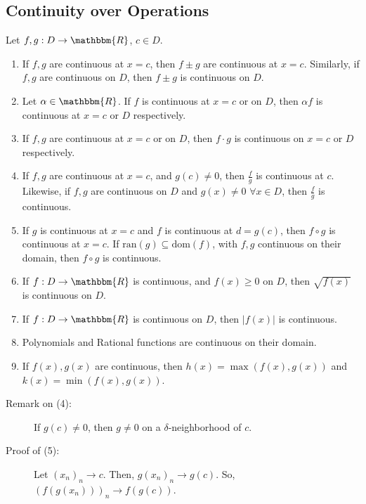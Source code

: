\documentclass[10pt]{extarticle}
\newcommand{\R}{\mathbbm{R}}
\begin{document}
  \subsection{Continuity over Operations}%
    Let $f,g: D\rightarrow \R$, $c\in D$.
    \begin{enumerate}[(1)]
      \item If $f,g$ are continuous at $x = c$, then $f\pm g$ are continuous at $x=c$. Similarly, if $f,g$ are continuous on $D$, then $f\pm g$ is continuous on $D$.
      \item Let $\alpha \in \R$. If $f$ is continuous at $x=c$ or on $D$, then $\alpha f$ is continuous at $x=c$ or $D$ respectively.
      \item If $f,g$ are continuous at $x=c$ or on $D$, then $f\cdot g$ is continuous on $x=c$ or $D$ respectively.
      \item If $f,g$ are continuous at $x=c$, and $g(c) \neq 0$, then $\frac{f}{g}$ is continuous at $c$. Likewise, if $f,g$ are continuous on $D$ and $g(x)\neq 0$ $\forall x\in D$, then $\frac{f}{g}$ is continuous.
      \item If $g$ is continuous at $x=c$ and $f$ is continuous at $d=g(c)$, then $f\circ g$ is continuous at $x=c$. If $\text{ran}(g) \subseteq \text{dom}(f)$, with $f,g$ continuous on their domain, then $f\circ g$ is continuous.
      \item If $f: D\rightarrow \R$ is continuous, and $f(x) \geq 0$ on $D$, then $\sqrt{f(x)}$ is continuous on $D$.
      \item If $f: D\rightarrow \R$ is continuous on $D$, then $|f(x)|$ is continuous.
      \item Polynomials and Rational functions are continuous on their domain.
      \item If $f(x),g(x)$ are continuous, then $h(x) = \max(f(x),g(x))$ and $k(x) = \min(f(x),g(x))$.
    \end{enumerate}
    \begin{description}
      \item[Remark on (4):] If $g(c) \neq 0$, then $g\neq 0$ on a $\delta$-neighborhood of $c$.
      \item[Proof of (5):] Let $(x_n)_n \rightarrow c$. Then, $g(x_n)_n \rightarrow g(c)$. So, $(f(g(x_n)))_n \rightarrow f(g(c))$.
    \end{description}
\end{document}
